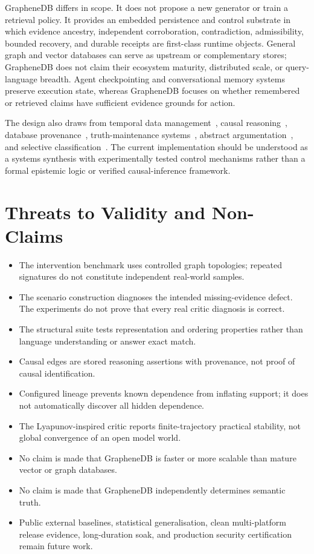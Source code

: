 \documentclass[10pt]{article}
\begin{document}
GrapheneDB differs in scope. It does not propose a new generator or train a retrieval policy. It provides an embedded persistence and control substrate in which evidence ancestry, independent corroboration, contradiction, admissibility, bounded recovery, and durable receipts are first-class runtime objects. General graph and vector databases can serve as upstream or complementary stores; GrapheneDB does not claim their ecosystem maturity, distributed scale, or query-language breadth. Agent checkpointing and conversational memory systems preserve execution state, whereas GrapheneDB focuses on whether remembered or retrieved claims have sufficient evidence grounds for action.

The design also draws from temporal data management~\cite{jensen1999temporal}, causal reasoning~\cite{pearl2009causality}, database provenance~\cite{buneman2001provenance,green2007provenance}, truth-maintenance systems~\cite{doyle1979tms}, abstract argumentation~\cite{dung1995argumentation}, and selective classification~\cite{elyaniv2010selective}. The current implementation should be understood as a systems synthesis with experimentally tested control mechanisms rather than a formal epistemic logic or verified causal-inference framework.

\section{Threats to Validity and Non-Claims}
\begin{itemize}[leftmargin=*]
  \item The intervention benchmark uses controlled graph topologies; repeated signatures do not constitute independent real-world samples.
  \item The scenario construction diagnoses the intended missing-evidence defect. The experiments do not prove that every real critic diagnosis is correct.
  \item The structural suite tests representation and ordering properties rather than language understanding or answer exact match.
  \item Causal edges are stored reasoning assertions with provenance, not proof of causal identification.
  \item Configured lineage prevents known dependence from inflating support; it does not automatically discover all hidden dependence.
  \item The Lyapunov-inspired critic reports finite-trajectory practical stability, not global convergence of an open model world.
  \item No claim is made that GrapheneDB is faster or more scalable than mature vector or graph databases.
  \item No claim is made that GrapheneDB independently determines semantic truth.
  \item Public external baselines, statistical generalisation, clean multi-platform release evidence, long-duration soak, and production security certification remain future work.
\end{itemize}
\end{document}
